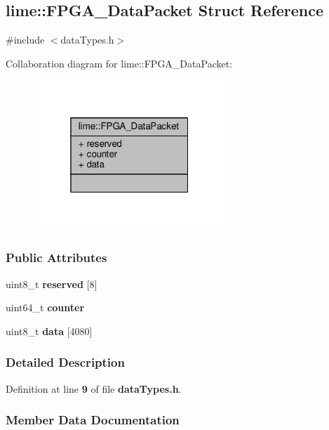 \subsection{lime\+:\+:F\+P\+G\+A\+\_\+\+Data\+Packet Struct Reference}
\label{structlime_1_1FPGA__DataPacket}


{\ttfamily \#include $<$data\+Types.\+h$>$}



Collaboration diagram for lime\+:\+:F\+P\+G\+A\+\_\+\+Data\+Packet\+:
\nopagebreak
\begin{figure}[H]
\begin{center}
\leavevmode
\includegraphics[width=205pt]{d2/de2/structlime_1_1FPGA__DataPacket__coll__graph}
\end{center}
\end{figure}
\subsubsection*{Public Attributes}
\begin{DoxyCompactItemize}
\item 
uint8\+\_\+t {\bf reserved} [8]
\item 
uint64\+\_\+t {\bf counter}
\item 
uint8\+\_\+t {\bf data} [4080]
\end{DoxyCompactItemize}


\subsubsection{Detailed Description}


Definition at line {\bf 9} of file {\bf data\+Types.\+h}.



\subsubsection{Member Data Documentation}
